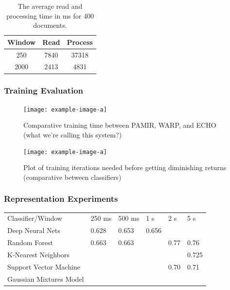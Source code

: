 \begin{table}[t]
    \centering
    \begin{tabular}{c|cc}
    \textbf{Window} & \textbf{Read} & \textbf{Process} \\ \hline
    250              & 7840           & 37318                    \\
    2000             & 2413           & 4831                   
    \end{tabular}
    \caption{The average read and processing time in ms for 400 documents.}
    \label{tab:base-time}
\end{table}

\subsubsection{Training Evaluation}

\begin{figure}
    \centering
    \texttt{[image: example-image-a]}
    \caption{Comparative training time between PAMIR, WARP, and ECHO (what we're calling this system?)}
    \label{fig:my-label}
\end{figure}

\begin{figure}
    \centering
    \texttt{[image: example-image-a]}
    \caption{Plot of training iterations needed before getting diminishing returns (comparative between classifiers)}
    \label{fig:learning-curve}
\end{figure}

\subsubsection{Representation Experiments}

\begin{table}[]
    \begin{tabular}{llllll}
    Classifier/Window       & 250 ms & 500 ms & 1 s   & 2 s  & 5 s   \\
    Deep Neural Nets        & 0.628  & 0.653  & 0.656 &      &       \\
    Random Forest           & 0.663  & 0.663  &       & 0.77 & 0.76  \\
    K-Nearest Neighbors     &        &        &       &      & 0.725 \\
    Support Vector Machine  &        &        &       & 0.70 & 0.71  \\
    Gaussian Mixtures Model &        &        &       &      &      
    \end{tabular}
\end{table}

